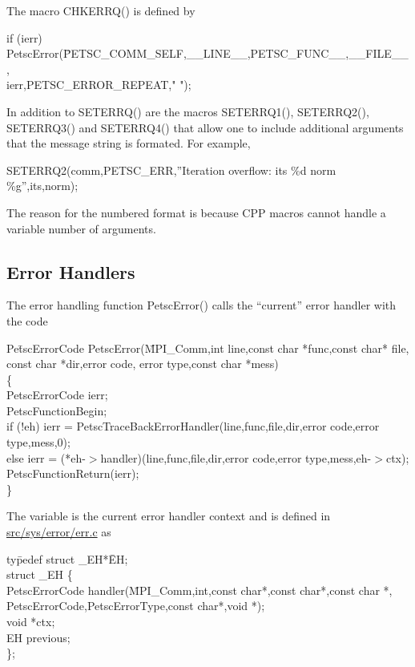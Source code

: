 \documentclass[twoside,12pt]{../sty/report_petsc}
\begin{document}
The macro CHKERRQ() is defined by
\begin{tabbing}
  if (ierr)  PetscError(\=PETSC\_COMM\_SELF,\_\_LINE\_\_,PETSC\_FUNC\_\_,\_\_FILE\_\_, \\
 \>ierr,PETSC\_ERROR\_REPEAT," ");
\end{tabbing}

In addition to SETERRQ() are the macros SETERRQ1(), SETERRQ2(), SETERRQ3()
and SETERRQ4() that allow one to include additional arguments that the message
string is formated. For example,
\begin{tabbing}
  SETERRQ2(comm,PETSC\_ERR,''Iteration overflow: its \%d norm \%g'',its,norm);
\end{tabbing}
The reason for the numbered format is because CPP macros cannot handle a variable number
of arguments.

\subsection{Error Handlers}
The error handling function PetscError() calls the ``current'' error handler
with the code
\begin{tabbing}
Pe\=tscErrorCode PetscError(\=MPI\_Comm,int line,const char *func,const char* file,\\
 \> \> const char *dir,error code, error type,const char *mess)\\
\{ \\
  \> PetscErrorCode ierr;\\
  \>PetscFunctionBegin;\\
  \>if (!eh)     ierr = PetscTraceBackErrorHandler(line,func,file,dir,error code,error type,mess,0);\\
  \>else         ierr = (*eh-$>$handler)(line,func,file,dir,error code,error type,mess,eh-$>$ctx);\\
  \>PetscFunctionReturn(ierr);\\
\}
\end{tabbing}
The variable  is the current error handler context and is defined in
 \href{http://www.mcs.anl.gov/petsc/petsc-master/src/sys/error/err.c.html}{src/sys/error/err.c} as
\begin{tabbing}
ty\=pedef struct \_EH*\= EH;\\
struct \_EH \{\\
  \>PetscErrorCode \> handler(\=MPI\_Comm,int,const char*,const char*,const char *,\\
\> \> \> PetscErrorCode,PetscErrorType,const char*,void *);\\
  \>void \>  *ctx;\\
  \>EH   \>  previous;\\
\};
\end{tabbing}
\end{document}
